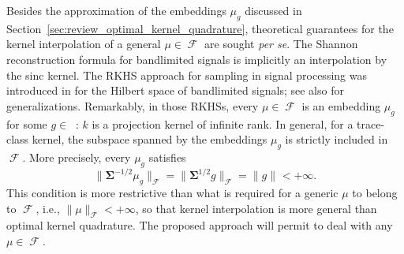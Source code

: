\documentclass[twoside,11pt]{book}
\DeclareMathOperator{\F}{\mathcal{F}}
\DeclareMathOperator{\Ltwo}{\mathbb{L}_{2}(\mathrm{d} \omega)}
\newcommand{\pc}[1]{\textcolor{blue}{#1}}
\begin{document}
Besides the approximation of the embeddings $\mu_{g}$ discussed in Section~\ref{sec:review_optimal_kernel_quadrature}, theoretical guarantees for the kernel interpolation of a general $\mu\in\F$ are sought \emph{per se}. The Shannon reconstruction formula for bandlimited signals \citep{Sha48} is implicitly an interpolation by the sinc kernel.
The RKHS approach for sampling in signal processing was introduced in \citep{Yao67} for the Hilbert space of bandlimited signals;
see also \citep{NaWa91} for generalizations.
Remarkably, in those RKHSs, every $\mu \in \F$ is an embedding $\mu_{g}$ for some $g \in \Ltwo$: $k$ is a projection kernel of infinite rank. In general, for a trace-class kernel, the subspace spanned by the embeddings $\mu_{g}$ is strictly included in $\F$. More precisely, every $\mu_{g}$ satisfies
\begin{equation}
\|\bm{\Sigma}^{-1/2} \mu_{g}\|_{\F} = \|\bm{\Sigma}^{1/2} g\|_{\F} = \|g\|_{\Ltwo} < +\infty.
\end{equation}
This condition is more restrictive than what is required for a generic $\mu$ to belong to $\F$, i.e., $\|\mu\|_{\F}< +\infty$, so that kernel interpolation is more general than optimal kernel quadrature. The proposed approach will permit to deal with any $\mu\in\F$.








%
\end{document}
